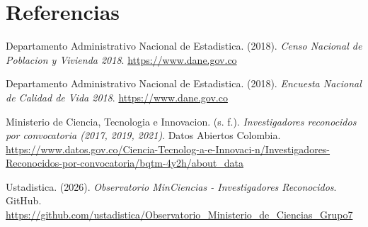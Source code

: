 \documentclass[12pt,letterpaper]{article}
\begin{document}
\section{Referencias}

Departamento Administrativo Nacional de Estadistica. (2018). \textit{Censo Nacional de Poblacion y Vivienda 2018}. \url{https://www.dane.gov.co}

Departamento Administrativo Nacional de Estadistica. (2018). \textit{Encuesta Nacional de Calidad de Vida 2018}. \url{https://www.dane.gov.co}

Ministerio de Ciencia, Tecnologia e Innovacion. (s. f.). \textit{Investigadores reconocidos por convocatoria (2017, 2019, 2021)}. Datos Abiertos Colombia. \url{https://www.datos.gov.co/Ciencia-Tecnolog-a-e-Innovaci-n/Investigadores-Reconocidos-por-convocatoria/bqtm-4y2h/about_data}

Ustadistica. (2026). \textit{Observatorio MinCiencias - Investigadores Reconocidos}. GitHub. \url{https://github.com/ustadistica/Observatorio_Ministerio_de_Ciencias_Grupo7}
\end{document}
